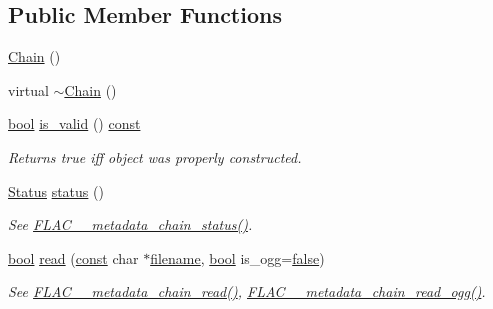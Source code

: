 \subsection*{Public Member Functions}
\begin{DoxyCompactItemize}
\item 
\hyperlink{class_f_l_a_c_1_1_metadata_1_1_chain_a3bede6b94bb81891af611f1ecb301260}{Chain} ()
\item 
virtual \hyperlink{class_f_l_a_c_1_1_metadata_1_1_chain_a5487119397cdb872f5b631ea38308a7c}{$\sim$\+Chain} ()
\item 
\hyperlink{mac_2config_2i386_2lib-src_2libsoxr_2soxr-config_8h_abb452686968e48b67397da5f97445f5b}{bool} \hyperlink{class_f_l_a_c_1_1_metadata_1_1_chain_a7c7799a4ed676ac334381af9e3888549}{is\+\_\+valid} () \hyperlink{getopt1_8c_a2c212835823e3c54a8ab6d95c652660e}{const} 
\begin{DoxyCompactList}\small\item\em Returns {\ttfamily true} iff object was properly constructed. \end{DoxyCompactList}\item 
\hyperlink{class_f_l_a_c_1_1_metadata_1_1_chain_1_1_status}{Status} \hyperlink{class_f_l_a_c_1_1_metadata_1_1_chain_ab35ee440a4730e95fa81e1e142deff93}{status} ()
\begin{DoxyCompactList}\small\item\em See \hyperlink{group__flac__metadata__level2_ga3d030e216a6517f23372bb76f0639127}{F\+L\+A\+C\+\_\+\+\_\+metadata\+\_\+chain\+\_\+status()}. \end{DoxyCompactList}\item 
\hyperlink{mac_2config_2i386_2lib-src_2libsoxr_2soxr-config_8h_abb452686968e48b67397da5f97445f5b}{bool} \hyperlink{class_f_l_a_c_1_1_metadata_1_1_chain_a509bf6a75a12df65bc77947a4765d9c1}{read} (\hyperlink{getopt1_8c_a2c212835823e3c54a8ab6d95c652660e}{const} char $\ast$\hyperlink{test__portburn_8cpp_a7efa5e9c7494c7d4586359300221aa5d}{filename}, \hyperlink{mac_2config_2i386_2lib-src_2libsoxr_2soxr-config_8h_abb452686968e48b67397da5f97445f5b}{bool} is\+\_\+ogg=\hyperlink{mac_2config_2i386_2lib-src_2libsoxr_2soxr-config_8h_a65e9886d74aaee76545e83dd09011727}{false})
\begin{DoxyCompactList}\small\item\em See \hyperlink{group__flac__metadata__level2_gadb7d8e9a82aeb43e256f0a948adf5c45}{F\+L\+A\+C\+\_\+\+\_\+metadata\+\_\+chain\+\_\+read()}, \hyperlink{group__flac__metadata__level2_gae7b34f2929bedea0e14ac14aca253a40}{F\+L\+A\+C\+\_\+\+\_\+metadata\+\_\+chain\+\_\+read\+\_\+ogg()}. \end{DoxyCompactList}\item 

\end{DoxyCompactItemize}
